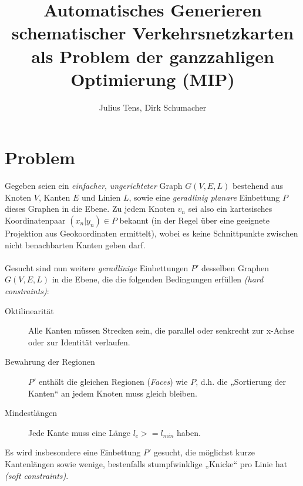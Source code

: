 \documentclass[a4paper,11pt]{amsart}
\title{Automatisches Generieren schematischer Verkehrsnetzkarten als Problem der ganzzahligen Optimierung (MIP)}
\author{Julius Tens, Dirk Schumacher}
\begin{document}
\maketitle

\section*{Problem}

\noindent Gegeben seien ein \textit{einfacher}, \textit{ungerichteter} Graph $G(V,E,L)$ bestehend aus Knoten $V$, Kanten $E$ und Linien $L$, sowie eine \textit{geradlinig planare} Einbettung $P$ dieses Graphen in die Ebene. Zu jedem Knoten $v_n$ sei also ein kartesisches Koordinatenpaar $(x_n | y_n) \in P$ bekannt (in der Regel über eine geeignete Projektion aus Geokoordinaten ermittelt), wobei es keine Schnittpunkte zwischen nicht benachbarten Kanten geben darf.
\\\\
Gesucht sind nun weitere \textit{geradlinige} Einbettungen $P'$ desselben Graphen $G(V,E,L)$ in die Ebene, die die folgenden Bedingungen erfüllen \textit{(hard constraints)}:
\bigskip

\begin{description}
\item[Oktilinearität] Alle Kanten müssen Strecken sein, die parallel oder senkrecht zur x-Achse oder zur Identität verlaufen.
\bigskip
\item[Bewahrung der Regionen] $P'$ enthält die gleichen Regionen (\textit{Faces}) wie $P$, d.h. die „Sortierung der Kanten“ an jedem Knoten muss gleich bleiben.
\bigskip
\item[Mindestlängen] Jede Kante muss eine Länge $l_e >= l_{min}$ haben.
\bigskip
\end{description}

\noindent Es wird insbesondere eine Einbettung $P'$ gesucht, die möglichst kurze Kantenlängen sowie wenige, bestenfalls stumpfwinklige „Knicke“ pro Linie hat \textit{(soft constraints)}.
\bigskip
\bigskip
\bigskip

\end{document}
